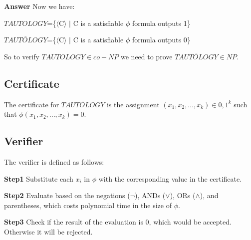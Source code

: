 \documentclass[12pt]{article}
\begin{document}
\textbf{Answer}
Now we have:

 $TAUTOLOGY$=\{$\langle$C$\rangle$ $\mid$ C is a satisfiable $\phi$ formula outputs 1\}
 
 
 $\overline{TAUTOLOGY} $=\{$\langle$C$\rangle$ $\mid$ C is a satisfiable $\phi$ formula outputs 0\}
 
So to verify $TAUTOLOGY \in co-NP$ we need to prove $\overline{TAUTOLOGY} \in NP$. 
 
 


\subsection{Certificate}
The certificate for $\overline{TAUTOLOGY}$ is the assignment $(x_1,x_2,...,x_k) \in {0,1}^k$ such that $\phi(x_1,x_2,...,x_k) = 0$.

\subsection{Verifier}
The verifier is defined as follows:

\textbf{Step1} Substitute each $x_i$ in $\phi$ with the corresponding value in the certificate.

\textbf{Step2} Evaluate based on the negations ($\neg$), ANDs ($\vee$), ORs ($\wedge$), and parentheses, which costs polynomial time in the size of $\phi$.

\textbf{Step3} Check if the result of the evaluation is 0, which would be accepted. Otherwise it will be rejected. 
\end{document}
